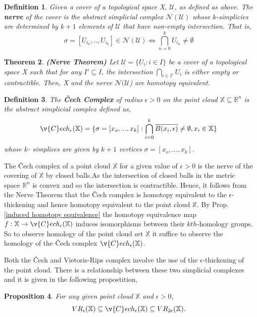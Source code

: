 \documentclass{article}
\newcommand{\be}{\begin{equation}}
\newcommand{\ee}{\end{equation}}
\newtheorem{theorem}{Theorem}[section]
\newtheorem{definition}[theorem]{Definition}
\newtheorem{proposition}[theorem]{Proposition}
\begin{document}
\begin{definition}Given a cover of a topological space X, $\mathcal{U}$, as defined as above. The \textbf{nerve} of the cover is the abstract simplicial complex $\mathcal{N}(\mathcal{U})$ whose $k$-simplicies are determined by $k+1$ elements of $\mathcal{U}$ that have non-empty intersection. That is,
\be
\sigma = [U_{i_0}, .., U_{i_k}] \in \mathcal{N}(\mathcal{U}) \iff \bigcap^{k}_{n=0} U_{i_n} \neq \emptyset
\ee
\end{definition}

\begin{theorem}\textbf{(Nerve Theorem)} Let $\mathcal{U} = \{U_i : i \in I\}$ be a cover of a topological space X such that for any $I' \subseteq I$, the intersection $\bigcap_{i\in I'}U_i$ is either empty or contractible. Then, X and the nerve $\mathcal{N}(\mathcal{U}$) are homotopy equivalent.
\end{theorem}


\begin{definition} The \textbf{\v{C}ech Complex} of radius $\epsilon > 0$ on the point cloud $\mathbb{X} \subseteq \mathbb{R}^n$ is the abstract simplicial complex defined as,
\be
\v{C}ech_{\epsilon}(\mathbb{X}) = \{\sigma = [x_o,...,x_k] : \bigcap^{k}_{i=0} \overline{B(x_i, \epsilon)}\neq \emptyset, x_i \in \mathbb{X}\}
\ee
whose $k$- simplices are given by $k+1$ vertices $\sigma = [x_o,...,x_k]$. 
\end{definition}
The \v{C}ech complex of a point cloud $\mathbb{X}$ for a given value of $\epsilon >0$ is the nerve of the covering of $\mathbb{X}$ by closed balls.As the intersection of closed balls in the metric space $\mathbb{R}^n$ is convex and so the intersection is contractible. Hence, it follows from the Nerve Theorem that the \v{C}ech complex is homotopy equivalent to the $\epsilon$-thickening and hence homotopy equivalent to the point cloud $\mathbb{X}$. By Prop.\ref{induced homotopy equivalence} the homotopy equivalence map $f: \mathbb{X} \to \v{C}ech_{\epsilon}(\mathbb{X})$ induces isomorphisms between their $kth$-homology groups. So to observe homology of the point cloud set $\mathbb{X}$ it suffice to observe the homology of the \v{C}ech complex $\v{C}ech_{\epsilon}(\mathbb{X})$.

Both the \v{C}ech and Vietoris-Rips complex involve the use of the $\epsilon$-thickening of the point cloud. 
There is a relationship between these two simplicial complexes and it is given in the following propostition,
\begin{proposition} For any given point cloud $\mathbb{X}$ and $\epsilon > 0 $,
\be
VR_{\epsilon}(\mathbb{X}) \subseteq \v{C}ech_{\epsilon}(\mathbb{X}) \subseteq VR_{2\epsilon}(\mathbb{X}).
\ee
\end{proposition}
\end{document}
